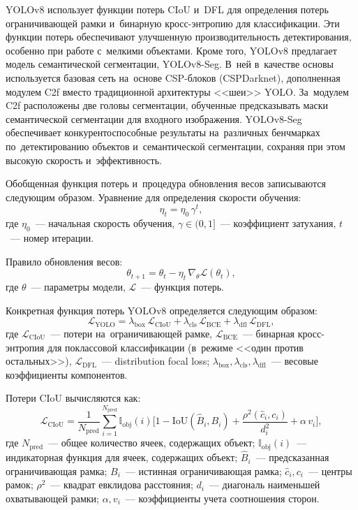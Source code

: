 YOLOv8 использует функции потерь CIoU и~DFL для определения потерь
ограничивающей рамки и~бинарную кросс-энтропию для классификации.
Эти функции потерь обеспечивают улучшенную производительность
детектирования, особенно при работе с~мелкими объектами. Кроме того,
YOLOv8 предлагает модель семантической сегментации, YOLOv8-Seg.
В~ней в~качестве основы используется базовая сеть на~основе CSP-блоков
(CSPDarknet), дополненная модулем C2f вместо традиционной
архитектуры <<шеи>> YOLO. За~модулем C2f расположены две головы
сегментации, обученные предсказывать маски семантической сегментации
для входного изображения. YOLOv8-Seg обеспечивает конкурентоспособные
результаты на~различных бенчмарках по~детектированию объектов
и~семантической сегментации, сохраняя при этом высокую скорость
и~эффективность.

Обобщенная функция потерь и~процедура обновления весов записываются
следующим образом. Уравнение для определения скорости обучения:
\begin{equation}\label{eq:ch2/lr}
    \eta_t=\eta_0\,\gamma^{t},
\end{equation}
где $\eta_0$~--- начальная скорость обучения, $\gamma\in(0,1]$~---
коэффициент затухания, $t$~--- номер итерации.

Правило обновления весов:
\begin{equation}\label{eq:ch2/sgd}
    \theta_{t+1}=\theta_t-\eta_t\,\nabla_\theta\mathcal{L}(\theta_t),
\end{equation}
где $\theta$~--- параметры модели, $\mathcal{L}$~--- функция потерь.

Конкретная функция потерь YOLOv8 определяется следующим образом:
\begin{equation}\label{eq:ch2/yolo-loss}
    \mathcal{L}_{\text{YOLO}}=\lambda_{\text{box}}\,\mathcal{L}_{\text{CIoU}}+\lambda_{\text{cls}}\,\mathcal{L}_{\text{BCE}}+\lambda_{\text{dfl}}\,\mathcal{L}_{\text{DFL}},
\end{equation}
где $\mathcal{L}_{\text{CIoU}}$~--- потери на~ограничивающей рамке,
$\mathcal{L}_{\text{BCE}}$~--- бинарная кросс-энтропия для
поклассовой классификации (в~режиме <<один против остальных>>), $\mathcal{L}_{\text{DFL}}$~---
distribution focal loss; $\lambda_{\text{box}},\lambda_{\text{cls}},\lambda_{\text{dfl}}$~---
весовые коэффициенты компонентов.

Потери CIoU вычисляются как:
\begin{equation}\label{eq:ch2/ciou}
    \mathcal{L}_{\text{CIoU}}=\frac{1}{N_{\text{pred}}}\sum_{i=1}^{N_{\text{pred}}}\mathbb{I}_{\text{obj}}(i)\bigl[1-\mathrm{IoU}(\hat{B}_i,B_i)+\frac{\rho^2(\hat{c}_i,c_i)}{d_i^2}+\alpha\,v_i\bigr],
\end{equation}
где $N_{\text{pred}}$~--- общее количество ячеек, содержащих объект;
$\mathbb{I}_{\text{obj}}(i)$~--- индикаторная функция для ячеек,
содержащих объект; $\hat{B}_i$~--- предсказанная ограничивающая рамка;
$B_i$~--- истинная ограничивающая рамка; $\hat{c}_i,c_i$~--- центры
рамок; $\rho^2$~--- квадрат евклидова расстояния; $d_i$~--- диагональ
наименьшей охватывающей рамки; $\alpha,v_i$~--- коэффициенты учета
соотношения сторон.


